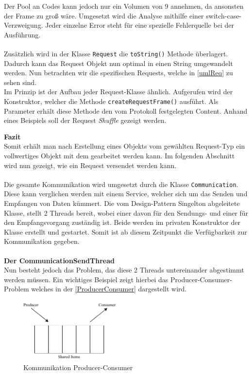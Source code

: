 Der Pool an Codes kann jedoch nur ein Volumen von 9 annehmen, da ansonsten der Frame zu groß wäre.
Umgesetzt wird die Analyse mithilfe einer switch-case-Verzweigung.
%
Jeder einzelne Error steht für eine spezielle Fehlerquelle bei der Ausführung.\\\\
Zusätzlich wird in der Klasse \lstinline[style=java]{Request} die \lstinline[style=java]{toString()} Methode überlagert.
Dadurch kann das Request Objekt nun optimal in einen String umgewandelt werden.
Nun betrachten wir die spezifischen Requests, welche in \autoref{umlReq} zu sehen sind.\\
Im Prinzip ist der Aufbau jeder Request-Klasse ähnlich.
Aufgerufen wird der Konstruktor, welcher die Methode \lstinline[style=java]{createRequestFrame()} ausführt.
Als Parameter erhält diese Methode den vom Protokoll festgelegten Content.
Anhand eines Beispiels soll der Request \textit{Shuffle} gezeigt werden.

\textbf{Fazit}\\
Somit erhält man nach Erstellung eines Objekts vom gewählten Request-Typ ein vollwertiges Objekt mit dem gearbeitet werden kann.
Im folgenden Abschnitt wird nun gezeigt, wie ein Request versendet werden kann.\\\\
Die gesamte Kommunikation wird umgesetzt durch die Klasse \lstinline[style=java]{Communication}.
Diese kann verglichen werden mit einem Service, welcher sich um das Senden und Empfangen von Daten kümmert.
Die vom Design-Pattern Singelton abgeleitete Klasse, stellt 2 Threads bereit, wobei einer davon für den Sendungs- und einer für den Empfangsvorgang zuständig ist.
Beide werden im privaten Konstruktor der Klasse erstellt und gestartet.
Somit ist ab diesem Zeitpunkt die Verfügbarkeit zur Kommunikation gegeben.\\\\
\textbf{Der CommunicationSendThread}\\
Nun besteht jedoch das Problem, das diese 2 Threads untereinander abgestimmt werden müssen.
Ein wichtiges Beispiel zeigt hierbei das Producer-Consumer-Problem welches in der \autoref{ProducerConsumer} dargestellt wird.
\begin{figure}[H]
\centering
\includegraphics[width=0.45\textwidth]{fig/ainf/ProducerConsumer.pdf}
\caption{Kommunikation Producer-Consumer}
\label{ProducerConsumer}
\end{figure}
